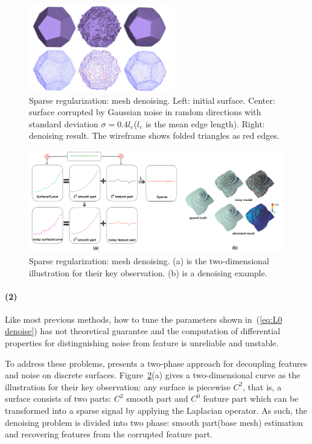 \begin{figure}[ht]
  \centering
  \includegraphics[width=2.5in]{images/denoise1}
  \caption{Sparse regularization: mesh denoising\cite{he2013mesh}. Left: initial surface. Center: surface corrupted by Gaussian noise in random directions with standard deviation $\sigma=0.4l_{e}$($l_{e}$ is the mean edge length). Right: denoising result. The wireframe shows folded triangles as red edges.}
  \label{fig:L0 denoise}
\end{figure}

\begin{figure}[ht]
  \centering
  \includegraphics[width=5in]{images/denoise2_1}
  \caption{Sparse regularization: mesh denoising\cite{wang2014decoupling}. (a) is the two-dimensional illustration for their key observation. (b) is a denoising example.}
  \label{fig:decoupling}
\end{figure}

\paragraph{(2)}
Like most previous methods, how to tune the parameters shown in~(\ref{eq:L0 denoise}) has not theoretical guarantee and the computation of differential properties for distinguishing noise from feature is unreliable and unstable.

To address these problems, \cite{wang2014decoupling} presents a two-phase approach for decoupling features and noise on discrete surfaces.
Figure~\ref{fig:decoupling}(a) gives a two-dimensional curve as the illustration for their key observation: any surface is piecewise $C^2$, that is, a surface consists of two parts: $C^2$ smooth part and $C^0$ feature part which can be transformed into a sparse signal by applying the Laplacian operator.
As such, the denoising problem is divided into two phase: smooth part(base mesh) estimation and recovering features from the corrupted feature part.


